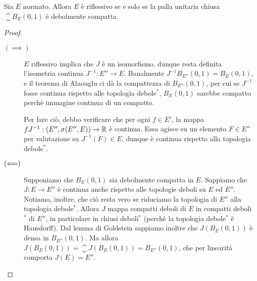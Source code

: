\begin{theorem}[Kakutani]
\label{th:kakutani}
	Sia $E$ normato.
	Allora $E$ è riflessivo se e solo se la palla unitaria chiusa $\closure B_E(0,1)$ è debolmente compatta.
\end{theorem}
\begin{proof}
	\leavevmode
	\begin{description}
		\item[$(\implies)$] $E$ riflessivo implica che $J$ è un isomorfismo, dunque resta definita l'isometria continua $J^{-1} : E'' \to E$. Banalmente $J^{-1}B_{E''}(0,1) = B_E(0,1)$, e il teorema di Alaouglu ci dà la compattezza di $B_{E''}(0,1)$, per cui se $J^{-1}$ fosse continua rispetto alle topologia debole$^*$, $B_E(0,1)$ sarebbe compatto perchè immagine continua di un compatto.

		Per fare ciò, debbo verificare che per ogni $f \in E'$, la mappa $f J^{-1} : (E'', \sigma(E'', E)) \to \mathbb{R}$ è continua. Essa agisce su un elemento $F \in E''$ per valutazione su $J^{-1}(F) \in E$, dunque è continua rispetto alla topologia debole$^*$.

		\item[$(\Longleftarrow)$] Supponiamo che $B_E(0,1)$ sia debolmente compatta in $E$. Sappiamo che $J:E \to E''$ è continua anche rispetto alle topologie deboli su $E$ ed $E''$. Notiamo, inoltre, che ciò resta vero se riduciamo la topologia di $E''$ alla topologia debole$^*$. Allora $J$ mappa compatti deboli di $E$ in compatti deboli$^*$ di $E''$, in particolare in chiusi deboli$^*$ (perchè la topologia debole$^*$ è Hausdorff). Dal lemma di Goldstein sappiamo inoltre che $J(B_E(0,1))$ è densa in $B_{E''}(0,1)$. Ma allora $J(B_E(0,1)) = \closure{J(B_E(0,1))} = B_{E''}(0,1)$, che per linearità comporta $J(E) = E''$.
	\end{description}
\end{proof}

